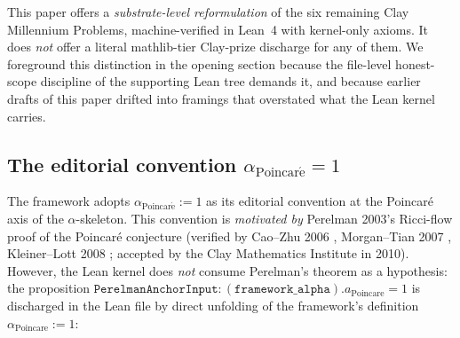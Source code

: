 \documentclass[11pt,a4paper]{article}
\theoremstyle{plain}
\theoremstyle{definition}
\begin{document}
This paper offers a \emph{substrate-level reformulation} of the
six remaining Clay Millennium Problems, machine-verified in
Lean~4 with kernel-only axioms. It does \emph{not} offer a
literal mathlib-tier Clay-prize discharge for any of them. We
foreground this distinction in the opening section because the
file-level honest-scope discipline of the supporting Lean tree
demands it, and because earlier drafts of this paper drifted
into framings that overstated what the Lean kernel carries.

\medskip

\noindent{}

\subsection{The editorial convention $\alpha_{\mathrm{Poincar\acute e}} = 1$}
\label{sec:editorial-convention}

The framework adopts $\alpha_{\mathrm{Poincar\acute e}} := 1$ as
its editorial convention at the Poincar\'e axis of the
$\alpha$-skeleton. This convention is \emph{motivated by}
Perelman 2003's Ricci-flow proof of the Poincar\'e conjecture
\cite{perelman2002,perelman2003a,perelman2003b} (verified by
Cao--Zhu 2006 \cite{caozhu2006}, Morgan--Tian 2007
\cite{morgantian2007}, Kleiner--Lott 2008 \cite{kleinerlott2008};
accepted by the Clay Mathematics Institute in 2010). However, the
Lean kernel does \emph{not} consume Perelman's theorem as a
hypothesis: the proposition
$\mathtt{PerelmanAnchorInput} : (\mathtt{framework\_alpha}
).a_{\mathrm{Poincare}} = 1$ is discharged in the Lean file by
direct unfolding of the framework's definition
$\alpha_{\mathrm{Poincare}} := 1$:
\end{document}
